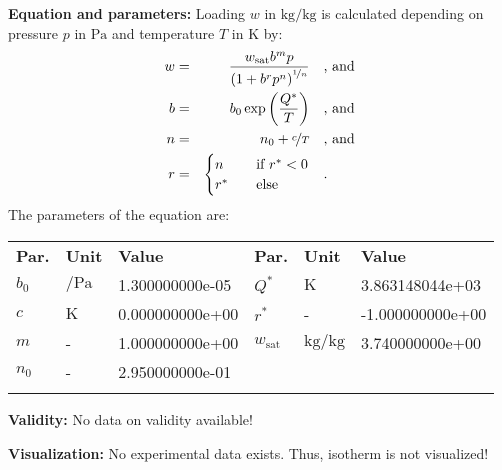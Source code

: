 \textbf{Equation and parameters:}
\newline
%
Loading $w$ in $\si{\kilogram\per\kilogram}$ is calculated depending on pressure $p$ in $\si{\pascal}$ and temperature $T$ in $\si{\kelvin}$ by:
%
\begin{equation*}
\begin{split}
w &=& \frac{w_\mathrm{sat} b^{m} p}{\left( 1 + b^{r} p^{n} \right)^{\nicefrac{1}{n}}} & \quad\text{, and} \\
b &=& b_0 \exp\left( \frac{Q^{*}}{T} \right) & \quad\text{, and} \\
n &=& n_0 + \nicefrac{c}{T} & \quad\text{, and} \\
r &=& \begin{cases} n & \quad \text{if } r^{*} < 0 \\ r^{*}  & \quad \text{else} \end{cases} & \quad\text{.}
\end{split}
\end{equation*}
%
The parameters of the equation are:
%
\begin{longtable}[l]{lll|lll}
\toprule
\addlinespace
\textbf{Par.} & \textbf{Unit} & \textbf{Value} &	\textbf{Par.} & \textbf{Unit} & \textbf{Value} \\
\addlinespace
\midrule
\endhead

\bottomrule
\endfoot
\bottomrule
\endlastfoot
\addlinespace

$b_0$ & $\si{\per\pascal}$ & 1.300000000e-05 & $Q^{*}$ & $\si{\kelvin}$ & 3.863148044e+03 \\
$c$ & $\si{\kelvin}$ & 0.000000000e+00 & $r^{*}$ & - & -1.000000000e+00 \\
$m$ & - & 1.000000000e+00 & $w_\mathrm{sat}$ & $\si{\kilogram\per\kilogram}$ & 3.740000000e+00 \\
$n_0$ & - & 2.950000000e-01 & & & \\

\addlinespace\end{longtable}

\textbf{Validity:}
\newline
No data on validity available!
\newline

\textbf{Visualization:}
%
\newline
No experimental data exists. Thus, isotherm is not visualized!
%

\FloatBarrier
\newpage
